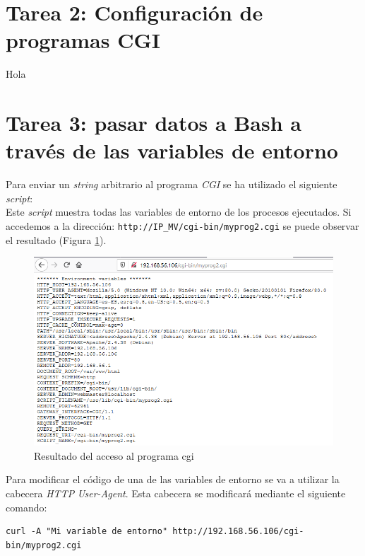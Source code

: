 \documentclass[10pt,a4paper]{article}
\begin{document}
\section{Tarea 2: Configuración de programas CGI}

Hola

\section{Tarea 3: pasar datos a Bash a través de las variables de entorno}

Para enviar un \emph{string} arbitrario al programa \emph{CGI} se ha utilizado el siguiente \emph{script}:\\



Este \emph{script} muestra todas las variables de entorno de los procesos ejecutados. Si accedemos a la dirección: \texttt{http://IP\_{}MV/cgi-bin/myprog2.cgi} se puede observar el resultado (Figura \ref{fig:tarea3_normal}).

\begin{figure}[h!]
\centering
\includegraphics[scale=0.6]{images/Tarea_3.png}
\caption{Resultado del acceso al programa cgi}
\label{fig:tarea3_normal} 
\end{figure}

Para modificar el código de una de las variables de entorno se va a utilizar la cabecera \emph{HTTP} \emph{User-Agent}. Esta cabecera se modificará mediante el siguiente comando:

\begin{lstlisting}
curl -A "Mi variable de entorno" http://192.168.56.106/cgi-bin/myprog2.cgi
\end{lstlisting}
\end{document}
